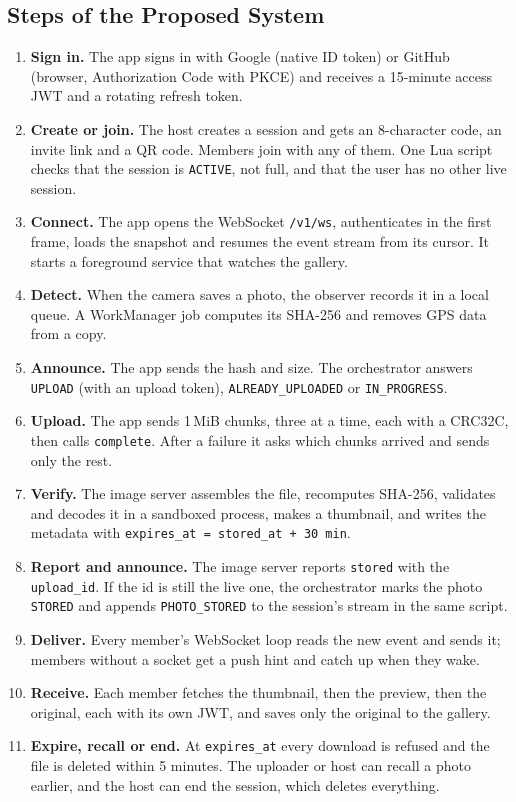 \subsection{Steps of the Proposed System}\label{sec:steps}

\begin{enumerate}[label=\textbf{Step \arabic*:}, leftmargin=*, align=left]
  \item \textbf{Sign in.} The app signs in with Google (native ID token) or GitHub (browser, Authorization Code with PKCE) and receives a 15-minute access JWT and a rotating refresh token.
  \item \textbf{Create or join.} The host creates a session and gets an 8-character code, an invite link and a QR code. Members join with any of them. One Lua script checks that the session is \texttt{ACTIVE}, not full, and that the user has no other live session.
  \item \textbf{Connect.} The app opens the WebSocket \texttt{/v1/ws}, authenticates in the first frame, loads the snapshot and resumes the event stream from its cursor. It starts a foreground service that watches the gallery.
  \item \textbf{Detect.} When the camera saves a photo, the observer records it in a local queue. A WorkManager job computes its SHA-256 and removes GPS data from a copy.
  \item \textbf{Announce.} The app sends the hash and size. The orchestrator answers \texttt{UPLOAD} (with an upload token), \texttt{ALREADY\_UPLOADED} or \texttt{IN\_PROGRESS}.
  \item \textbf{Upload.} The app sends 1\,MiB chunks, three at a time, each with a CRC32C, then calls \texttt{complete}. After a failure it asks which chunks arrived and sends only the rest.
  \item \textbf{Verify.} The image server assembles the file, recomputes SHA-256, validates and decodes it in a sandboxed process, makes a thumbnail, and writes the metadata with \texttt{expires\_at = stored\_at + 30 min}.
  \item \textbf{Report and announce.} The image server reports \texttt{stored} with the \texttt{upload\_id}. If the id is still the live one, the orchestrator marks the photo \texttt{STORED} and appends \texttt{PHOTO\_STORED} to the session's stream in the same script.
  \item \textbf{Deliver.} Every member's WebSocket loop reads the new event and sends it; members without a socket get a push hint and catch up when they wake.
  \item \textbf{Receive.} Each member fetches the thumbnail, then the preview, then the original, each with its own JWT, and saves only the original to the gallery.
  \item \textbf{Expire, recall or end.} At \texttt{expires\_at} every download is refused and the file is deleted within 5 minutes. The uploader or host can recall a photo earlier, and the host can end the session, which deletes everything.
\end{enumerate}

